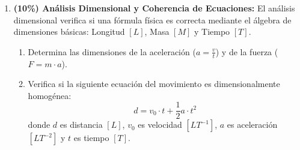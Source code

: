 \documentclass[11pt, letterpaper]{article}
\newif\ifshowanswers
\newcommand{\answer}[1]{
	\ifshowanswers
	\par\vspace{0.15cm}
	\begin{tcolorbox}[colback=blue!5!white, colframe=blue!60!white, arc=1mm, boxrule=0.5pt, title=\textbf{\footnotesize SOLUCIÓN PASO A PASO (DOCENTE)}]
		\color{blue!80!black}\footnotesize #1
	\end{tcolorbox}
	\par\vspace{0.15cm}
	\else
	\par\vspace{0.3cm}
	\fi
}
\begin{document}
\begin{enumerate}[leftmargin=*, itemsep=0.8cm]
		\item \textbf{(10\%) Análisis Dimensional y Coherencia de Ecuaciones:} 
		El análisis dimensional verifica si una fórmula física es correcta mediante el álgebra de dimensiones básicas: Longitud $[L]$, Masa $[M]$ y Tiempo $[T]$.
		\begin{enumerate}[label=\alph*), itemsep=0.2cm]
			\item Determina las dimensiones de la aceleración ($a = \frac{v}{t}$) y de la fuerza ($F = m \cdot a$).
			\item Verifica si la siguiente ecuación del movimiento es dimensionalmente homogénea:
			\[ d = v_0 \cdot t + \frac{1}{2} a \cdot t^2 \]
			donde $d$ es distancia $[L]$, $v_0$ es velocidad $[L T^{-1}]$, $a$ es aceleración $[L T^{-2}]$ y $t$ es tiempo $[T]$.
		\end{enumerate}
		
		\answer{
			\textbf{Demostración dimensional paso a paso:}
			\begin{itemize}[itemsep=0.15cm]
				\item a) Dimensiones de velocidad: $[v] = [L T^{-1}]$. \\
				Aceleración: $[a] = \frac{[v]}{[t]} = \frac{[L T^{-1}]}{[T]} = \mathbf{[L T^{-2}]}$. \\
				Fuerza: $[F] = [m] \cdot [a] = \mathbf{[M L T^{-2}]}$ (equivale a Newtons).
				\item b) Evaluamos cada término de la ecuación $d = v_0 \cdot t + \frac{1}{2} a \cdot t^2$:
				\begin{itemize}
					\item Lado izquierdo: $[d] = \mathbf{[L]}$.
					\item Primer término del lado derecho: $[v_0 \cdot t] = [L T^{-1}] \cdot [T] = \mathbf{[L]}$.
					\item Segundo término del lado derecho (las constantes adimensionales como $1/2$ no tienen dimensiones): $[\frac{1}{2} a \cdot t^2] = [L T^{-2}] \cdot [T^2] = \mathbf{[L]}$.
				\end{itemize}
				Como todos los términos tienen dimensiones de Longitud $[L]$, la ecuación es \textbf{dimensionalmente homogénea y correcta}.
			\end{itemize}
		}
		

\end{enumerate}
\end{document}
